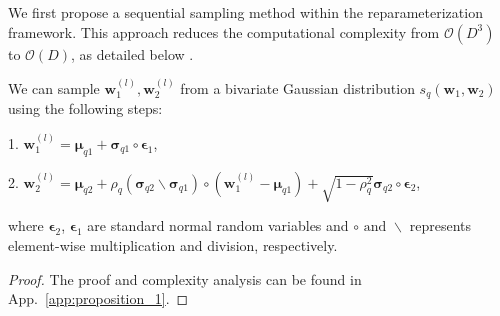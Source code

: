 We first propose a sequential sampling method within the reparameterization framework. This approach reduces the computational complexity from \(\mathcal{O}(D^3)\) to \(\mathcal{O}(D)\), as detailed below \citep{mohamed2020monte}.
\begin{proposition}
\label{prop:Two-step reparameterization trick}

We can sample \(\mathbf{w}_{1}^{(l)}, \mathbf{w}_{2}^{(l)}\) from a bivariate Gaussian distribution \(s_q(\mathbf{w}_1, \mathbf{w}_2)\) using the following steps:

1. \!\!$\mathbf{w}_{1}^{(l)} \!=\! \bm \mu_{q1} + \bm \sigma_{q1}\!\circ \bm \epsilon_1$, 

2. \!\!$\mathbf{w}_{2}^{(l)}\!=\!\bm \mu_{q2}+\rho_q(\bm \sigma_{q2} \backslash \bm \sigma_{q1}) \circ (\mathbf{w}_{1}^{(l)} \!-\! \bm \mu_{q1})\!+\!\sqrt{1\!-\! \rho_q^2} \bm \sigma_{q2} \circ \bm \epsilon_2$,

where \(\bm \epsilon_2\), \(\bm \epsilon_1\) are standard normal random variables and $\circ \text{ and } \backslash$ represents element-wise multiplication and division, respectively. \vspace{-.15in}
\end{proposition} 
\begin{proof}
The proof and complexity analysis can be found in App.~\ref{app:proposition_1}.
\vspace{-0.1in}
\end{proof}



